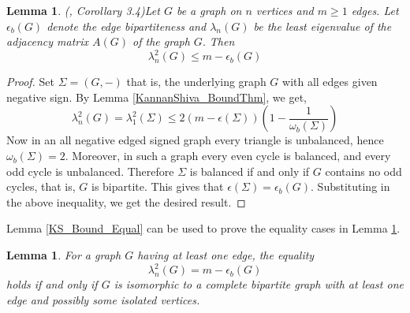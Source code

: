\documentclass[12pt]{article}
\theoremstyle{plain}
\newtheorem{lemma}[theorem]{Lemma}
\numberwithin{equation}{section}
\begin{document}
	\begin{lemma}\emph{(\cite{kannan2023signed}, Corollary 3.4)}\label{smallest_eigenvalue}
		Let $G$ be a graph on $n$ vertices and $m \geq 1$ edges. Let $\epsilon_{b}(G)$ denote the edge bipartiteness and $\lambda_{n}(G)$ be the least eigenvalue of the adjacency matrix $A(G)$ of the graph $G.$ Then
		\begin{equation}\label{Favaron_Ineq}
			\lambda_{n}^{2}(G)\leq m-\epsilon_{b}(G)
		\end{equation}
	\end{lemma}
	\begin{proof}
		Set $\Sigma=(G,-)$ that is, the underlying graph $G$ with all edges given negative sign. By Lemma \ref{KannanShiva_BoundThm}, we get,\\
		\begin{equation*}
			\lambda_n^2(G) =\lambda_1^2(\Sigma)\leq  2(m-\epsilon(\Sigma)) \left(1-\dfrac{1}{\omega_b(\Sigma)}\right) 
		\end{equation*}
		Now in an all negative edged signed graph every triangle is unbalanced, hence $\omega_b(\Sigma)=2$. Moreover, in such a graph every even cycle is balanced, and every odd cycle is unbalanced. Therefore $\Sigma$ is balanced if and only if $G$ contains no odd cycles, that is, $G$ is bipartite. This gives that $\epsilon(\Sigma)=\epsilon_b(G)$. Substituting in the above inequality, we get the desired result.
	\end{proof}
	Lemma \ref{KS_Bound_Equal} can be used to prove the equality cases in Lemma \ref{smallest_eigenvalue}.
	\begin{lemma}\label{Fav_Equality}
		For a graph $G$ having at least one edge, the equality
		\begin{equation}\label{Fav_Eq}
			\lambda_{n}^{2}(G)= m-\epsilon_{b}(G)
		\end{equation}
		holds if and only if $G$ is isomorphic to a complete bipartite graph with at least one edge and possibly some isolated vertices.
	\end{lemma}
\end{document}
